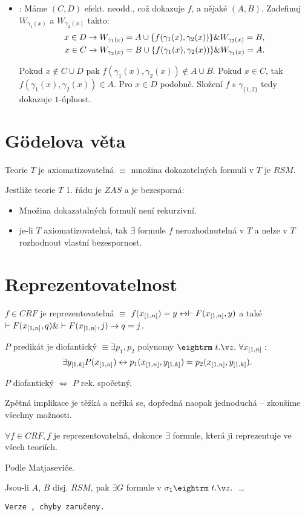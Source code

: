 \begin{multicols}{3}
\begin{itemize}
\item \uv{$\leftarrow$}: Máme $(C,D)$ efekt. neodd., což dokazuje $f$, a nějaké
$(A,B)$. Zadefinuj $W_{\gamma_1(x)}$ a $W_{\gamma_2(x)}$ takto:
\begin{align*}
x \in D &\rightarrow W_{\gamma_1(x)} = A \cup \{f(\gamma_1(x), \gamma_2(x))\} \& W_{\gamma_2(x)} = B, \\
x \in C &\rightarrow W_{\gamma_2(x)} = B \cup \{f(\gamma_1(x), \gamma_2(x))\} \& W_{\gamma_1(x)} = A.
\end{align*}

Pokud $x \not \in C \cup D$ pak $f(\gamma_1(x), \gamma_2(x)) \not \in A \cup
B$.  Pokud $x \in C$, tak $f(\gamma_1(x), \gamma_2(x)) \in A$. Pro $x \in D$
podobně. Složení $f$ s $\gamma_{\{1,2\}}$ tedy dokazuje $1$-úplnost.
\end{itemize}

\section{Gödelova věta}

\dfn{} Teorie $T$ je axiomatizovatelná $\equiv$ množina dokazatelných formulí v $T$ je $RSM$. 

 Jestliže teorie $T$ 1. řádu je $ZAS$ a je bezesporná:

\begin{itemize}
\item Množina dokazatalných formulí není rekurzivní.
\item je-li $T$ axiomatizovatelná, tak $\exists$ formule $f$ nerozhodnutelná v $T$ a nelze v $T$ rozhodnout vlastní bezespornost.
\end{itemize}

\section{Reprezentovatelnost}

\dfn{} $f \in CRF$ je reprezentovatelná $\equiv$ $f(x_{[1,n]} ) = y \leftrightarrow \vdash F( x_{[1,n]} , y)$ a také
$\vdash F(x_{[1,n]} , q) \& \vdash F(x_{[1,n]} , j) \rightarrow q = j$.

\dfn{} $P$ predikát je diofantický $\equiv \exists p_1, p_2$ polynomy $\st \forall \mls x n :$
$$ \exists y_{[1,k]} P(x_{[1,n]} ) \leftrightarrow p_1(x_{[1,n]} , y_{[1,k]} ) = p_2(x_{[1,n]} , y_{[1,k]} ).$$

 $P$ diofantický $\iff$ $P$ rek. spočetný.

\prf{} Zpětná implikace je těžká a neříká se, dopředná naopak jednoduchá -- zkoušíme všechny možnosti.

\thm{} $\forall f \in CRF, f$ je reprezentovatelná, dokonce $\exists$ formule, která ji reprezentuje ve všech teoriích.

\prf{} Podle Matjaseviče.

\res{}  Jsou-li $A$, $B$ disj. $RSM$, pak $\exists G$ formule v $\sigma_1 \st$ \dots

{\tt Verze \versionnumber, chyby zaručeny.} 
\end{multicols}
